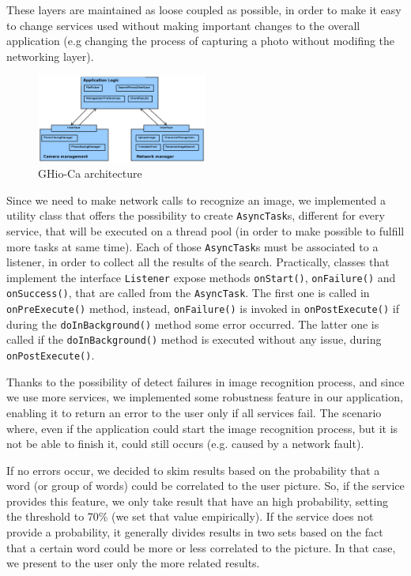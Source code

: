 These layers are maintained as loose coupled as possible, in order to make it
easy to change services used without making important changes to the overall
application (e.g changing the process of capturing a photo without modifing the
networking layer).

\begin{figure}[h]
    \centering
    \includegraphics[width=0.50\textwidth]{../img/ghioca_macro_component}
    \caption{GHio-Ca architecture}
    \label{fig:architecture}
\end{figure}

Since we need to make network calls to recognize an image, we implemented a
utility class that offers the possibility to create \texttt{AsyncTask}s,
different for every service, that will be executed on a thread pool (in order to
make possible to fulfill more tasks at same time). Each of those
\texttt{AsyncTask}s must be associated to a listener, in order to collect all
the results of the search. Practically, classes that implement the interface
\texttt{Listener} expose methods \texttt{onStart()}, \texttt{onFailure()} and
\texttt{onSuccess()}, that are called from the \texttt{AsyncTask}. The first one
is called in \texttt{onPreExecute()} method, instead, \texttt{onFailure()} is 
invoked in \texttt{onPostExecute()} if during the \texttt{doInBackground()} 
method some error occurred. The latter one is called if the 
\texttt{doInBackground()} method is executed without any issue, during 
\texttt{onPostExecute()}.

Thanks to the possibility of detect failures in image recognition process, and 
since we use more services, we implemented some robustness feature in our 
application, enabling it to return an error to the user only if all services 
fail. The scenario where, even if the application could start the image 
recognition process, but it is not be able to finish it, could still occurs 
(e.g. caused by a network fault).

If no errors occur, we decided to skim results based on the probability that a
word (or group of words) could be correlated to the user picture. So, if the
service provides this feature, we only take result that have an high
probability, setting the threshold to 70\% (we set that value empirically). If 
the service does not provide a probability, it generally divides results in two 
sets based on the fact that a certain word could be more or less correlated to 
the picture. In that case, we present to the user only the more related results.

